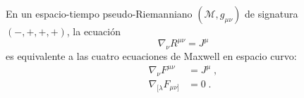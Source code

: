             \begin{myteo}
                \label{teo:EquivRG}
                En un espacio-tiempo pseudo-Riemanniano $(\mathcal{M},g_{\mu\nu})$ de signatura $(-,+,+,+)$, la ecuación
                \begin{equation}\label{eq:MaxRS_RG_teo}
                    \nabla_{\nu}R^{\mu\nu} = J^{\mu}
                \end{equation}
                es equivalente a las cuatro ecuaciones de Maxwell en espacio curvo:
                \begin{align}
                    \nabla_{\nu}F^{\mu\nu} &= J^{\mu}\;,\label{eq:M1RG}\\
                    \nabla_{[\lambda}F_{\mu\nu]} &= 0\;.\label{eq:M2RG}
                \end{align}
            \end{myteo}

